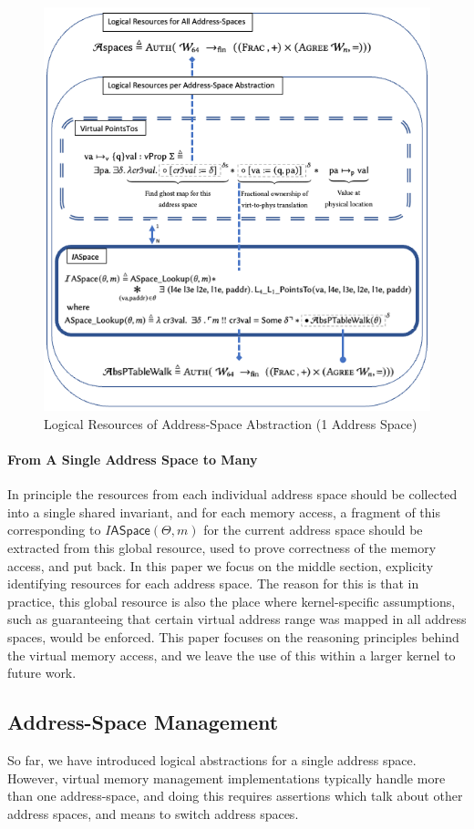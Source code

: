 \documentclass[acmsmall,screen,nonacm]{acmart}
\begin{document}
\begin{figure}
   \includegraphics[width=0.75\columnwidth]{logical_addr_space.png}
  \caption{Logical Resources of Address-Space Abstraction (1 Address Space)}
  \label{fig:logicaladdrspace}
  \end{figure}

\paragraph{From A Single Address Space to Many}
In principle the resources from each individual address space should be collected into a single
shared invariant, and for each memory access,
a fragment of this corresponding to $ I\textsf{ASpace}(\Theta,m)$
for the current address space should be extracted from this global resource, used to prove correctness of the
memory access, and put back.
In this paper we focus on the middle section, explicity identifying resources for each
address space. The reason for this is that in practice, this global resource is also
the place where kernel-specific assumptions, such as guaranteeing that certain virtual address range
was mapped in all address spaces, would be enforced. This paper focuses on the
reasoning principles behind the virtual memory access, and we leave the use of this within a larger
kernel to future work.

\subsection{Address-Space Management}
\label{sec:aspacemanagement}
So far, we have introduced logical abstractions for a single address space. However, virtual memory management
implementations typically handle more than one address-space,
and doing this requires assertions which talk about other address spaces, and means to switch address spaces.
%
\end{document}
